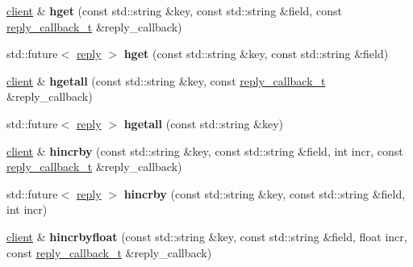 \begin{DoxyCompactItemize}
\item 
\mbox{\label{classcpp__redis_1_1client_ac1db14da1ab3d1353ce35a1c923979e3}} 
\hyperlink{classcpp__redis_1_1client}{client} \& {\bfseries hget} (const std\+::string \&key, const std\+::string \&field, const \hyperlink{classcpp__redis_1_1client_a061a1140d36d2eaeda82b09a0bb3f9f2}{reply\+\_\+callback\+\_\+t} \&reply\+\_\+callback)
\item 
\mbox{\label{classcpp__redis_1_1client_aa84b4c8e9391f5ed37d4c9ef977e2c85}} 
std\+::future$<$ \hyperlink{classcpp__redis_1_1reply}{reply} $>$ {\bfseries hget} (const std\+::string \&key, const std\+::string \&field)
\item 
\mbox{\label{classcpp__redis_1_1client_a8bd82cb86dad87a944c039a57bf67968}} 
\hyperlink{classcpp__redis_1_1client}{client} \& {\bfseries hgetall} (const std\+::string \&key, const \hyperlink{classcpp__redis_1_1client_a061a1140d36d2eaeda82b09a0bb3f9f2}{reply\+\_\+callback\+\_\+t} \&reply\+\_\+callback)
\item 
\mbox{\label{classcpp__redis_1_1client_a44321960e02c6ee6b6b36ffc960e4257}} 
std\+::future$<$ \hyperlink{classcpp__redis_1_1reply}{reply} $>$ {\bfseries hgetall} (const std\+::string \&key)
\item 
\mbox{\label{classcpp__redis_1_1client_a517b6bdeb07edf20f5e57eb1b4942dd5}} 
\hyperlink{classcpp__redis_1_1client}{client} \& {\bfseries hincrby} (const std\+::string \&key, const std\+::string \&field, int incr, const \hyperlink{classcpp__redis_1_1client_a061a1140d36d2eaeda82b09a0bb3f9f2}{reply\+\_\+callback\+\_\+t} \&reply\+\_\+callback)
\item 
\mbox{\label{classcpp__redis_1_1client_aee1f9d8b1fe77bc5bed18000a9cf8b6f}} 
std\+::future$<$ \hyperlink{classcpp__redis_1_1reply}{reply} $>$ {\bfseries hincrby} (const std\+::string \&key, const std\+::string \&field, int incr)
\item 
\mbox{\label{classcpp__redis_1_1client_ade2a386b51e8bbd59cd7feef51bd0637}} 
\hyperlink{classcpp__redis_1_1client}{client} \& {\bfseries hincrbyfloat} (const std\+::string \&key, const std\+::string \&field, float incr, const \hyperlink{classcpp__redis_1_1client_a061a1140d36d2eaeda82b09a0bb3f9f2}{reply\+\_\+callback\+\_\+t} \&reply\+\_\+callback)

\end{DoxyCompactItemize}

